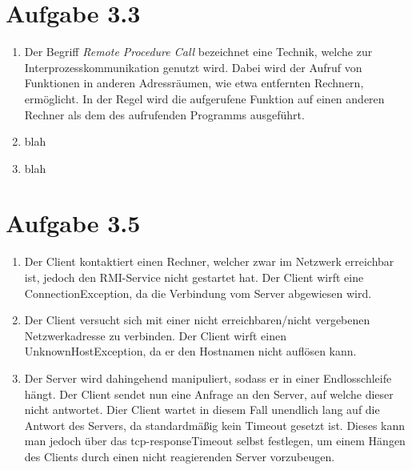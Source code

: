 \documentclass[german,12pt,a4paper]{article}
\begin{document}
\section*{Aufgabe 3.3}

\begin{enumerate}

	\item Der Begriff \textit{Remote Procedure Call} bezeichnet eine Technik, welche zur Interprozesskommunikation genutzt wird. 
	Dabei wird der Aufruf von Funktionen in anderen Adressräumen, wie etwa entfernten Rechnern, ermöglicht. In der Regel wird die 
	aufgerufene Funktion auf einen anderen Rechner als dem des aufrufenden Programms ausgeführt.
	 
	\item blah

	\item blah
	
\end{enumerate}

\section*{Aufgabe 3.5}

\begin{enumerate}

	\item Der Client kontaktiert einen Rechner, welcher zwar im Netzwerk erreichbar ist, jedoch den RMI-Service nicht gestartet hat.
	Der Client wirft eine ConnectionException, da die Verbindung vom Server abgewiesen wird.
	 
	\item Der Client versucht sich mit einer nicht erreichbaren/nicht vergebenen Netzwerkadresse zu verbinden. 
	Der Client wirft einen UnknownHostException, da er den Hostnamen nicht auflösen kann.

	\item Der Server wird dahingehend manipuliert, sodass er in einer Endlosschleife hängt. Der Client sendet nun eine Anfrage an 
	den Server, auf welche dieser nicht antwortet. Dier Client wartet in diesem Fall unendlich lang auf die Antwort des Servers, da standardmäßig 
	kein Timeout gesetzt ist. Dieses kann man jedoch über das tcp-responseTimeout selbst festlegen, um einem Hängen des Clients durch einen 
	nicht reagierenden Server vorzubeugen.
	
\end{enumerate}
\end{document}
